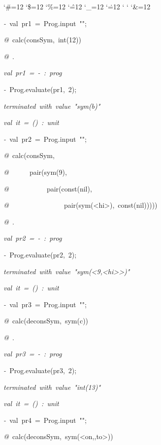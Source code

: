 \begin{list}{}
{\setlength{\leftmargin}{\leftmargini}
\setlength{\rightmargin}{0cm}
\setlength{\itemindent}{0cm}
\setlength{\listparindent}{0cm}
\setlength{\itemsep}{0cm}
\setlength{\parsep}{0cm}
\setlength{\labelsep}{0cm}
\setlength{\labelwidth}{0cm}
\catcode`\#=12
\catcode`\$=12
\catcode`\%=12
\catcode`\^=12
\catcode`\_=12
\catcode`\.=12
\catcode`
\catcode`
\catcode`\&=12
\ttfamily}
\small
\item[]\textsl{-\ }val\ pr1\ =\ Prog.input\ "";
\item[]\textsl{@\ }calc(consSym,\ int(12))
\item[]\textsl{@\ }.
\item[]\textsl{val\ pr1\ =\ -\ :\ prog}
\item[]\textsl{-\ }Prog.evaluate(pr1,\ 2);
\item[]\textsl{terminated\ with\ value\ "sym(b)"}
\item[]\textsl{val\ it\ =\ ()\ :\ unit}
\item[]\textsl{-\ }val\ pr2\ =\ Prog.input\ "";
\item[]\textsl{@\ }calc(consSym,
\item[]\textsl{@\ }\ \ \ \ \ pair(sym(9),
\item[]\textsl{@\ }\ \ \ \ \ \ \ \ \ \ pair(const(nil),
\item[]\textsl{@\ }\ \ \ \ \ \ \ \ \ \ \ \ \ \ \ pair(sym(<hi>),\ const(nil)))))
\item[]\textsl{@\ }.
\item[]\textsl{val\ pr2\ =\ -\ :\ prog}
\item[]\textsl{-\ }Prog.evaluate(pr2,\ 2);
\item[]\textsl{terminated\ with\ value\ "sym(<9,<hi>>)"}
\item[]\textsl{val\ it\ =\ ()\ :\ unit}
\item[]\textsl{-\ }val\ pr3\ =\ Prog.input\ "";
\item[]\textsl{@\ }calc(deconsSym,\ sym(c))
\item[]\textsl{@\ }.
\item[]\textsl{val\ pr3\ =\ -\ :\ prog}
\item[]\textsl{-\ }Prog.evaluate(pr3,\ 2);
\item[]\textsl{terminated\ with\ value\ "int(13)"}
\item[]\textsl{val\ it\ =\ ()\ :\ unit}
\item[]\textsl{-\ }val\ pr4\ =\ Prog.input\ "";
\item[]\textsl{@\ }calc(deconsSym,\ sym(<on,,to>))

\end{list}
